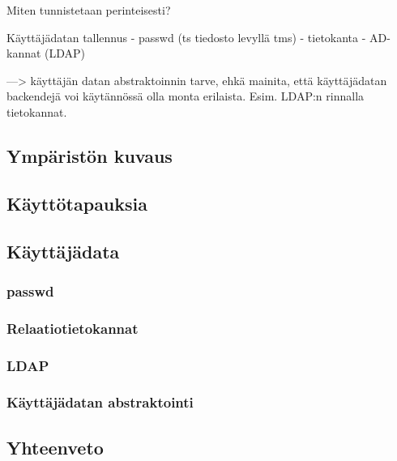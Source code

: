 Miten tunnistetaan perinteisesti?

Käyttäjädatan tallennus
- passwd (ts tiedosto levyllä tms)
- tietokanta
- AD-kannat (LDAP)

---> käyttäjän datan abstraktoinnin tarve, ehkä mainita, että käyttäjädatan backendejä voi käytännössä olla monta erilaista. Esim. LDAP:n rinnalla tietokannat.


\subsection{Ympäristön kuvaus}

\subsection{Käyttötapauksia}

\subsection{Käyttäjädata}

\subsubsection{passwd}

\subsubsection{Relaatiotietokannat}

\subsubsection{LDAP}

\subsubsection{Käyttäjädatan abstraktointi}

\subsection{Yhteenveto}

